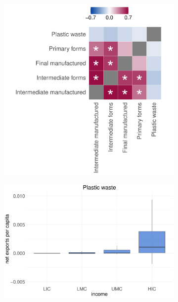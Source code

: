 \documentclass[dvipsnames]{article}
\begin{document}
\begin{figure}[htb!]
\begin{subfigure}{0.3\textwidth}
		\includegraphics[width=\textwidth]{figures/heatmap_trade.pdf}
		\label{subfig:heatmap_products}
	\end{subfigure}
	\begin{subfigure}{0.345\textwidth}
		\centering
		\includegraphics[width=\textwidth]{figures/boxplot_plastic_waste.pdf}	
		\label{subfig:plastic_waste}
	\end{subfigure}
	\begin{subfigure}{0.345\textwidth}
		\centering 

\end{subfigure}
\end{figure}
\end{document}
